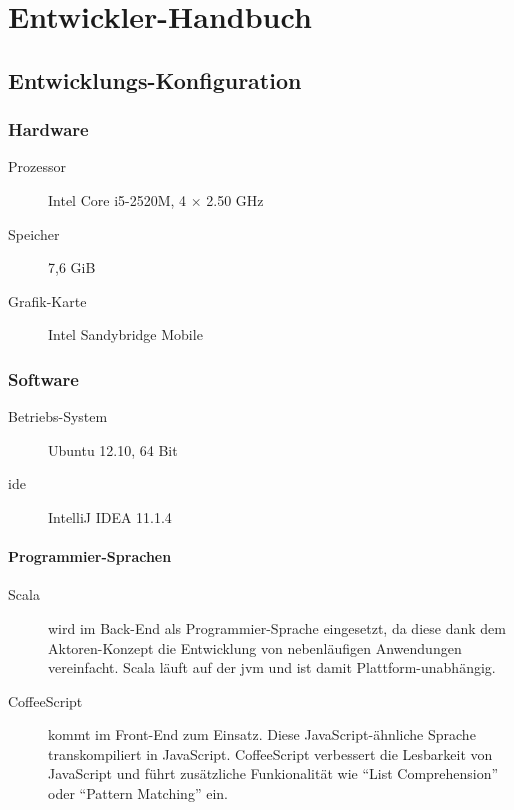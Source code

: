 \chapter{Entwickler-Handbuch}
\label{chap:entwickler-handbuch}

\section{Entwicklungs-Konfiguration}
\label{sec:entwicklungs-konfiguration}

\subsection{Hardware}
\label{sec:hardware}

\begin{description}
  \item[Prozessor] Intel Core i5-2520M, 4 $\times$ 2.50 GHz
  \item[Speicher] 7,6 GiB
  \item[Grafik-Karte] Intel Sandybridge Mobile
\end{description}

\subsection{Software}
\label{sec:software}

\begin{description}
  \item[Betriebs-System] Ubuntu 12.10, 64 Bit
  \item[\gls{ide}] IntelliJ IDEA 11.1.4
\end{description}

\subsubsection{Programmier-Sprachen}
\label{sec:programmier-sprachen}

\begin{description}
  \item[Scala] wird im Back-End als Programmier-Sprache eingesetzt, da diese dank dem Aktoren-Konzept die Entwicklung von nebenläufigen Anwendungen vereinfacht.
    Scala läuft auf der \gls{jvm} und ist damit Plattform-unabhängig.
  \item[CoffeeScript] kommt im Front-End zum Einsatz.
    Diese JavaScript-ähnliche Sprache transkompiliert in JavaScript.
    CoffeeScript verbessert die Lesbarkeit von JavaScript und führt zusätzliche Funkionalität wie ``List Comprehension'' oder ``Pattern Matching'' ein.
\end{description}


